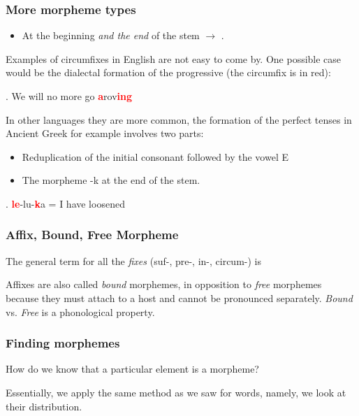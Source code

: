 \begin {frame}
\frametitle{More morpheme types}
  \begin{itemize}
  \item At the beginning \textit{and the end} of the stem $\rightarrow$ .
  \end{itemize}

Examples of circumfixes in English are not easy to come by.  One possible case would be the dialectal formation of the progressive (the circumfix is in red):

\ex.
We will no more go \textcolor{red}{\textbf{a}}rov\textcolor{red}{\textbf{ing}}

In other languages they are more common, the formation of the perfect tenses in Ancient Greek for example involves two parts:

\begin{itemize}
\item Reduplication of the initial consonant followed by the vowel E
\item The morpheme -k at the end of the stem.
\end{itemize}


\ex. \textcolor{red}{\textbf{le}}-lu-\textcolor{red}{\textbf{k}}a = I have loosened

\end{frame}

\begin{frame}
\frametitle{Affix, Bound, Free Morpheme}
  The general term for all the  \textit{fixes} (suf-, pre-, in-, circum-) is 
  \begin{center}
  \end{center}
\pause

Affixes are also called \textit{bound} morphemes, in opposition to \textit{free} morphemes because they must attach to a host and cannot be pronounced separately.  \textit{Bound} vs. \textit{Free} is a phonological property.


\end{frame}
\begin{frame}
  \frametitle{Finding morphemes}

How do we know that a particular element is a morpheme?

Essentially, we apply the same method as we saw for words, namely, we look at their distribution. 

\end{frame}


